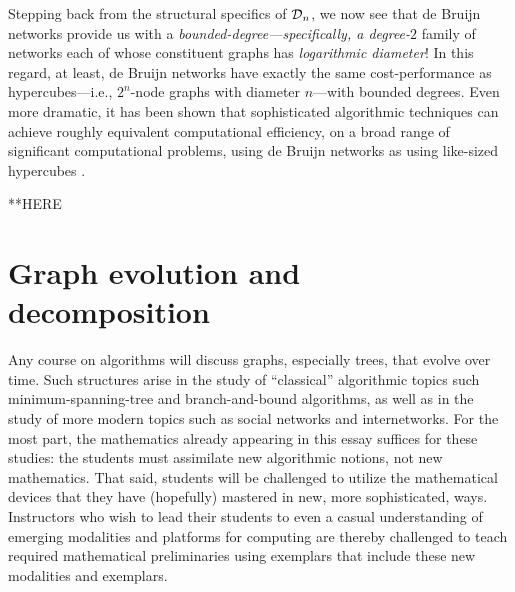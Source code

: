\bigskip

Stepping back from the structural specifics of $\mbox{$\cal D$}_n$, we now see that
de Bruijn networks provide us with a {\em
  bounded-degree---specifically, a degree-$2$} family of networks each
of whose constituent graphs has {\em logarithmic diameter}!  In this
regard, at least, de Bruijn networks have exactly the same
cost-performance as hypercubes---i.e., $2^n$-node graphs with diameter
$n$---with bounded degrees.  Even more dramatic, it has been shown
that sophisticated algorithmic techniques can achieve roughly
equivalent computational efficiency, on a broad range of significant
computational problems, using de Bruijn networks as using like-sized
hypercubes \cite{AnnexsteinBR90, BermondP89, Ullman84}.



**HERE

\section{Graph evolution and decomposition}

Any course on algorithms will discuss graphs, especially trees, that
evolve over time.  Such structures arise in the study of ``classical''
algorithmic topics such minimum-spanning-tree and branch-and-bound
algorithms, as well as in the study of more modern topics such as
social networks and internetworks.  For the most part, the mathematics
already appearing in this essay suffices for these studies: the students
must assimilate new algorithmic notions, not new mathematics.  That
said, students will be challenged to utilize the mathematical devices
that they have (hopefully) mastered in new, more sophisticated, ways.
Instructors who wish to lead their students to even a casual
understanding of emerging modalities and platforms for computing are
thereby challenged to teach required mathematical preliminaries using
exemplars that include these new modalities and exemplars.

